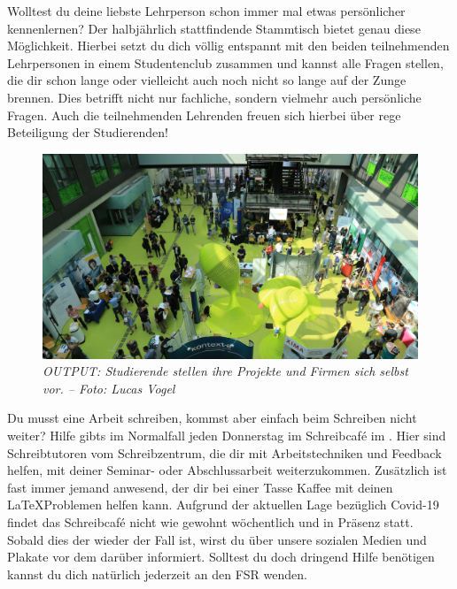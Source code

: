 
Wolltest du deine liebste Lehrperson schon immer mal etwas persönlicher kennenlernen? Der halbjährlich stattfindende Stammtisch bietet genau diese Möglichkeit. Hierbei setzt du dich völlig entspannt mit den beiden teilnehmenden Lehrpersonen in einem Studentenclub zusammen und kannst alle Fragen stellen, die dir schon lange oder vielleicht auch noch nicht so lange auf der Zunge brennen. Dies betrifft nicht nur fachliche, sondern vielmehr auch persönliche Fragen. Auch die teilnehmenden Lehrenden freuen sich hierbei über rege Beteiligung der Studierenden!

\begin{figure}[b!]
	\centering
  \includegraphics[width=.95\linewidth,keepaspectratio]{img/output}
  \caption*{\small \centering \textit{OUTPUT\@: Studierende stellen ihre Projekte und Firmen sich selbst vor. -- Foto: Lucas Vogel}}
\end{figure}%


Du musst eine Arbeit schreiben, kommst aber einfach beim Schreiben nicht weiter? Hilfe gibts im Normalfall jeden Donnerstag im Schreibcaf\'e im \ascii. Hier sind Schreibtutoren vom Schreibzentrum, die dir mit Arbeitstechniken und Feedback helfen, mit deiner Seminar- oder Abschlussarbeit weiterzukommen. Zusätzlich ist fast immer jemand anwesend, der dir bei einer Tasse Kaffee mit deinen \LaTeX Problemen helfen kann.
Aufgrund der aktuellen Lage bezüglich Covid-19 findet das Schreibcaf\'e nicht wie gewohnt wöchentlich und in Präsenz statt. Sobald dies der wieder der Fall ist, wirst du über unsere sozialen Medien und Plakate vor dem \ascii darüber informiert. 
Solltest du doch dringend Hilfe benötigen kannst du dich natürlich jederzeit an den FSR wenden.



